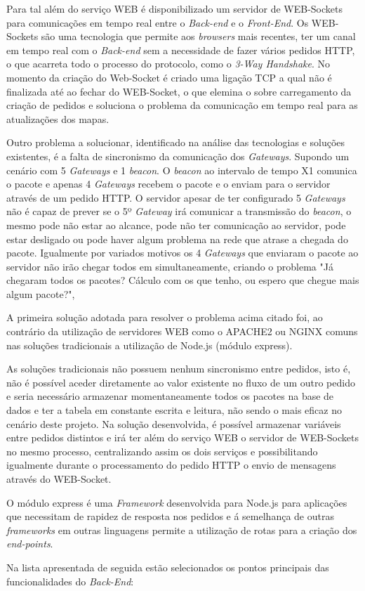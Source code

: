 \par Para tal além do serviço WEB é disponibilizado um servidor de WEB-Sockets para comunicações em tempo real entre o \textit{Back-end} e o \textit{Front-End}. Os WEB-Sockets são uma tecnologia que permite aos \textit{browsers} mais recentes, ter um canal em tempo real com o \textit{Back-end} sem a necessidade de fazer vários pedidos HTTP, o que acarreta todo o processo do protocolo, como o \textit{3-Way Handshake}. No momento da criação do Web-Socket é criado uma ligação TCP a qual não é finalizada até ao fechar do WEB-Socket, o que elemina o sobre carregamento da criação de pedidos e soluciona o problema da comunicação em tempo real para as atualizações dos mapas.

\par Outro problema a solucionar, identificado na análise das tecnologias e soluções existentes, é a falta de sincronismo da comunicação dos \textit{Gateways}. Supondo um cenário com 5 \textit{Gateways} e 1 \textit{beacon}. O \textit{beacon} ao intervalo de tempo X1 comunica o pacote e apenas 4 \textit{Gateways} recebem o pacote e o enviam para o servidor através de um pedido HTTP. O servidor apesar de ter configurado 5 \textit{Gateways} não é capaz de prever se o 5º \textit{Gateway} irá comunicar a transmissão do \textit{beacon}, o mesmo pode não estar ao alcance, pode não ter comunicação ao servidor, pode estar desligado ou pode haver algum problema na rede que atrase a chegada do pacote. Igualmente por variados motivos os 4 \textit{Gateways} que enviaram o pacote ao servidor não irão chegar todos em simultaneamente, criando o problema "Já chegaram todos os pacotes? Cálculo com os que tenho, ou espero que chegue mais algum pacote?",

\par A primeira solução adotada para resolver o problema acima citado foi, ao contrário da utilização de servidores WEB como o APACHE2 ou NGINX comuns nas soluções tradicionais a utilização de Node.js (módulo express). 
\par As soluções tradicionais não possuem nenhum sincronismo entre pedidos, isto é, não é possível aceder diretamente ao valor existente no fluxo de um outro pedido e seria necessário armazenar momentaneamente todos os pacotes na base de dados e ter a tabela em constante escrita e leitura, não sendo o mais eficaz no cenário deste projeto. Na solução desenvolvida, é possível armazenar variáveis entre pedidos distintos e irá ter além do serviço WEB o servidor de WEB-Sockets no mesmo processo, centralizando assim os dois serviços e possibilitando igualmente durante o processamento do pedido HTTP o envio de mensagens através do WEB-Socket. 
\par O módulo express é uma \textit{Framework} desenvolvida para Node.js para aplicações que necessitam de rapidez de resposta nos pedidos e á semelhança de outras \textit{frameworks} em outras linguagens permite a utilização de rotas para a criação dos \textit{end-points}.
\par Na lista apresentada de seguida estão selecionados os pontos principais das funcionalidades do \textit{Back-End}:

